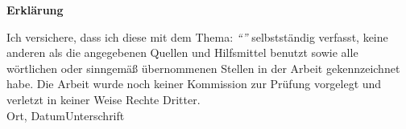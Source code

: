 \newpage
\thispagestyle{empty}
\begin{framed}
\begin{center}
\Large\bfseries Erklärung
\end{center}
\medskip
\noindent
Ich versichere, dass ich diese \Was mit dem Thema:
\textit{\enquote{\Titel}}
selbstständig verfasst, keine anderen als die angegebenen Quellen und Hilfsmittel benutzt sowie alle wörtlichen oder sinngemäß übernommenen Stellen in der Arbeit gekennzeichnet habe. 
Die Arbeit wurde noch keiner Kommission zur Prüfung vorgelegt und verletzt in keiner Weise Rechte Dritter.
\vspace{3cm}
\noindent
\underline{\hspace{0cm}}\hfill\underline{\hspace{15cm}}\\
Ort, Datum\hfill Unterschrift\hspace{4cm}
\end{framed}

\endinput
